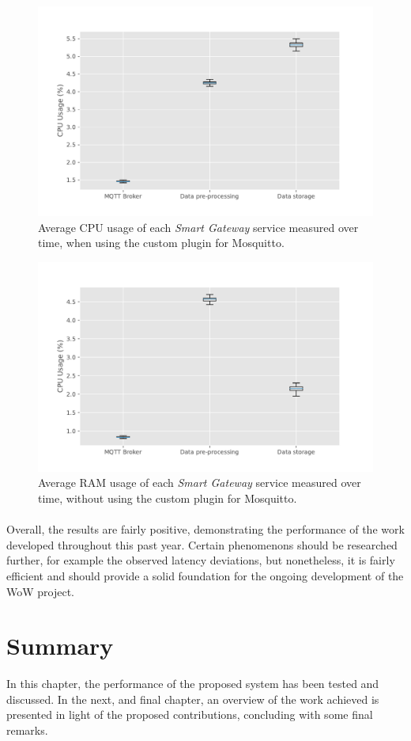 \begin{figure}[H]
    \centering
    \includegraphics[width=0.85\linewidth]{images/labtest_cpu_usage_with_plugin.pdf}
    \caption{Average \acs{CPU} usage of each \textit{Smart Gateway} service measured over time, when using the custom plugin for Mosquitto.}
    \label{fig:labtest-cpu-usage}
\end{figure}


\begin{figure}[H]
    \centering
    \includegraphics[width=0.85\linewidth]{images/labtest_cpu_usage_without_plugin.pdf}
    \caption{Average \acs{RAM} usage of each \textit{Smart Gateway} service measured over time, without using the custom plugin for Mosquitto.}
    \label{fig:labtest-cpu-usage-noplug}
\end{figure}


\paragraph{} Overall, the results are fairly positive, demonstrating the performance of the work developed throughout this past year. Certain phenomenons should be researched further, for example the observed latency deviations, but nonetheless, it is fairly efficient and should provide a solid foundation for the ongoing development of the \acs{WoW} project.

\section{Summary}
In this chapter, the performance of the proposed system has been tested and discussed. 
In the next, and final chapter, an overview of the work achieved is presented in light of the proposed contributions, concluding with some final remarks.